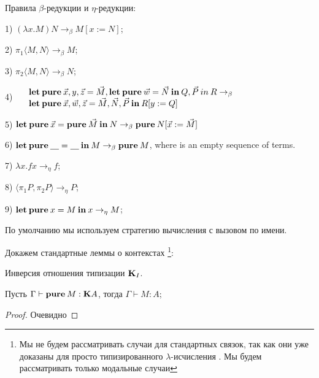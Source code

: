 \begin{defin} Правила $\beta$-редукции и $\eta$-редукции:

1) $(\lambda x. M) N \rightarrow_{\beta} M [x := N]$;

2) $\pi_1 \langle M, N \rangle \rightarrow_{\beta} M$;

3) $\pi_2 \langle M, N \rangle \rightarrow_{\beta} N$;

4) $\begin{array}{llll}
& {\bf let \: pure \:} \vec{x}, y, \vec{z} = \vec{M}, {\bf let \: pure \: } \vec{w} = \vec{N} {\: \bf in \: } Q, \vec{P} {\: in \:} R \rightarrow_{\beta} & \\
& {\bf let \: pure \:} \vec{x}, \vec{w}, \vec{z} = \vec{M}, \vec{N}, \vec{P} {\: \bf in \: } R [y := Q]
\end{array}$

5) ${\bf let \: pure \:} \vec{x} = {\bf pure \:} \vec{M} {\: \bf in \:} N \rightarrow_{\beta} {\bf pure \:} N [\vec{x} := \vec{M}]$

6) ${\bf let \: pure \:} \underline{\quad} = \underline{\quad} {\: \bf in \:} M \rightarrow_{\beta} {\bf pure \:} M$, where \underline{\quad} is an empty sequence of terms.

7) $\lambda x. f x \rightarrow_{\eta} f$;

8) $\langle \pi_1 P, \pi_2 P \rangle \rightarrow_{\eta} P$;

9) ${\bf let \: pure \:} x = M {\: \bf in \: } x \rightarrow_{\eta} M$;

\end{defin}

По умолчанию мы используем стратегию вычисления с вызовом по имени.

Докажем стандартные леммы о контекстах \footnote{Мы не будем рассматривать случаи для стандартных связок, так как они уже доказаны для просто типизированного $\lambda$-исчисления \cite{Neder} \cite{Morten}. Мы будем рассматривать только модальные случаи}:

\begin{lemma} Инверсия отношения типизации ${\bf K}_I$.

Пусть $\Gamma \vdash {\bf pure \:} M : {\bf K}A$, тогда $\Gamma \vdash M : A$;
\end{lemma}

\begin{proof}
Очевидно
\end{proof}

